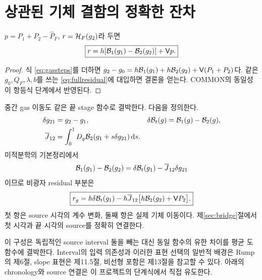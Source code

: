 \section{상관된 기체 결함의 정확한 잔차}\label{sec:residual}
\begin{theorem}\label{thm:residual}
$p=P_1+P_2-\widehat P_F$, $r=\mathcal H_F(g_2)$라 두면
\begin{equation}
\boxed{r=h[\mathcal B_1(g_1)-\mathcal B_2(g_2)]+\mathsf Vp.}
\label{eq:residualdecomp}
\end{equation}
\end{theorem}
\begin{proof}
식 \eqref{eq:gassteps}를 더하면
$g_2-g_0=h\mathcal B_1(g_1)+h\mathcal B_2(g_2)+\mathsf V(P_1+P_2)$다.
같은 $g_0,Q_F,\lambda,b$를 쓰는 \eqref{eq:fullresidual}에 대입하면 결론을 얻는다. COMMON의 동일성이 항등식 단계에서 반영된다.
\end{proof}

중간 gas 이동도 같은 끝 stage 함수로 결박한다. 다음을 정의한다.
\begin{align}
\delta g_{21}&=g_2-g_1,&
\delta\mathcal B_t(g)&=\mathcal B_1(g)-\mathcal B_2(g),\\
\overline J_{12}
&=\int_0^1D_g\mathcal B_2(g_1+s\delta g_{21})\,\mathrm d s.
\end{align}
미적분학의 기본정리에서
\begin{equation}
\mathcal B_1(g_1)-\mathcal B_2(g_2)
=\delta\mathcal B_t(g_1)-\overline J_{12}\delta g_{21}
\end{equation}
이므로 비광자 residual 부분은
\begin{equation}
\boxed{
r_g=h\delta\mathcal B_t(g_1)
-h\overline J_{12}\bigl[h\mathcal B_2(g_2)+\mathsf VP_2\bigr].
}
\label{eq:gasdecomp}
\end{equation}
첫 항은 source 시각의 계수 변화, 둘째 항은 실제 기체 이동이다. 제\ref{sec:bridge}절에서 첫 시각과 끝 시각의 source를 정확히 연결한다.

이 구성은 독립적인 source interval 둘을 빼는 대신 동일 함수의 유한 차이를 평균 도함수에 결박한다. Interval의 입력 의존성과 이러한 표현 선택의 일반적 배경은 Rump의 제6절, slope 표현은 제11.5절, 비선형 포함은 제13절을 참고할 수 있다.\cite{rump} 아래의 chronology와 source 연결은 이 프로젝트의 단계식에서 직접 유도한다.

